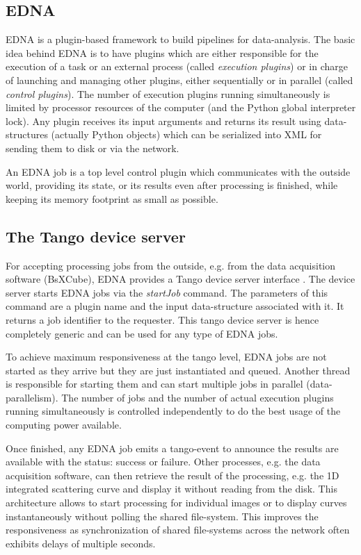 \documentclass[preprint,pdf]{iucr}              %
\begin{document}


\subsection{EDNA}
EDNA is a plugin-based framework to build pipelines for data-analysis.
The basic idea behind EDNA is to have plugins which are either responsible for the execution
of a task or an external process (called \textit{execution plugins}) or in
charge of launching and managing other plugins, either sequentially or in
parallel (called \textit{control plugins}).
The number of execution plugins running simultaneously is limited by processor
resources of the computer (and the Python global interpreter lock).
Any plugin receives its input arguments and returns its result using
data-structures (actually Python objects) which can be serialized into XML for
sending them to disk or via the network.

An EDNA job is a top level control plugin which communicates with the outside
world, providing its state, or its results even after processing is finished,
while keeping its memory footprint as small as possible.

\subsection{The Tango device server}
For accepting processing jobs from the outside, e.g. from the data
acquisition software (BsXCube), EDNA provides a Tango device server interface
\cite{tango,pytango}.
The device server starts EDNA jobs via the \textit{startJob} command.
The parameters of this command are a plugin name and the input data-structure
associated with it.
It returns a job identifier to the requester.
This tango device server is hence completely generic and can be used for any
type of EDNA jobs.

To achieve maximum responsiveness at the tango level, EDNA jobs are not started as
they arrive but they are just instantiated and queued.
Another thread is responsible for starting them and can start multiple jobs in parallel
(data-parallelism). The number of jobs and the number of actual execution
plugins running simultaneously is controlled independently to do the best usage
of the computing power available.

Once finished, any EDNA job emits a tango-event to announce the results are
available with the status: success or failure.
Other processes, e.g. the data acquisition software, can then retrieve the result
of the processing, e.g. the 1D integrated scattering curve and
display it without reading from the disk.
This architecture allows to start processing for individual images or to
display curves instantaneously without polling the shared file-system.
This improves the responsiveness as synchronization of shared file-systems across the network
often exhibits delays of multiple seconds.
\end{document}

